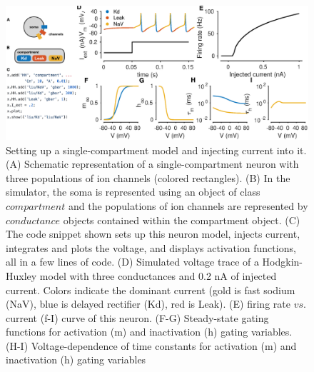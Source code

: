 \documentclass{frontiersSCNS} %
\begin{document}
%
%
%
%
%
%



\FloatBarrier

\newpage



\begin{figure}
	\centering
	\includegraphics[width=1.0\linewidth]{gfx/figure_HH}
	\caption{Setting up a single-compartment model and injecting current into it. (A) Schematic representation of a single-compartment neuron with three populations of ion channels (colored rectangles). (B) In the simulator, the soma is represented using an object of class $compartment$ and the populations of ion channels are represented by $conductance$ objects contained within the compartment object. (C) The code snippet shown sets up this neuron model, injects current, integrates and plots the voltage, and displays activation functions, all in a few lines of code. (D) Simulated voltage trace of a Hodgkin-Huxley model with three conductances and 0.2 nA of injected current. Colors indicate the dominant current (gold is fast sodium (NaV), blue is delayed rectifier (Kd), red is Leak). (E) firing rate $vs$. current (f-I) curve of this neuron. (F-G) Steady-state gating functions for activation (m) and inactivation (h) gating variables. (H-I) Voltage-dependence of time constants for activation (m) and inactivation (h) gating variables}
	\label{fig:figurehh}
\end{figure}
\end{document}
